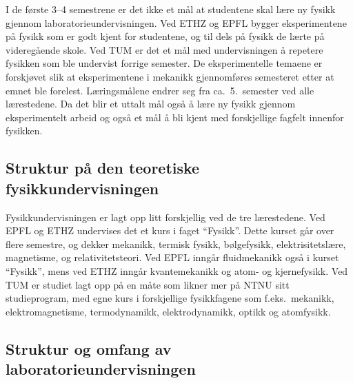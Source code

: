 \documentclass{article}
\begin{document}
I de første 3--4 semestrene er det ikke et mål at studentene skal lære ny fysikk gjennom laboratorieundervisningen. Ved ETHZ og EPFL bygger eksperimentene på fysikk som er godt kjent for studentene, og til dels på fysikk de lærte på videregående skole. Ved TUM er det et mål med undervisningen å repetere fysikken som ble undervist forrige semester. De eksperimentelle temaene er forskjøvet slik at eksperimentene i mekanikk gjennomføres semesteret etter at emnet ble forelest.
Læringsmålene endrer seg fra ca.~5.~semester ved alle lærestedene. Da det blir et uttalt mål også å lære ny fysikk gjennom eksperimentelt arbeid og også et mål å bli kjent med forskjellige fagfelt innenfor fysikken.

\subsection{Struktur på den teoretiske fysikkundervisningen}
Fysikkundervisningen er lagt opp litt forskjellig ved de tre lærestedene. Ved EPFL og ETHZ undervises det et kurs i faget ``Fysikk''. Dette kurset går over flere semestre, og dekker mekanikk, termisk fysikk, bølgefysikk, elektrisitetslære, magnetisme, og relativitetsteori. Ved EPFL inngår fluidmekanikk også i kurset ``Fysikk'', mens ved ETHZ inngår kvantemekanikk og atom- og kjernefysikk. Ved TUM er studiet lagt opp på en måte som likner mer på NTNU sitt studieprogram, med egne kurs i forskjellige fysikkfagene som f.eks.~mekanikk, elektromagnetisme, termodynamikk, elektrodynamikk, optikk og atomfysikk.

\subsection{Struktur og omfang av laboratorieundervisningen}
\end{document}
